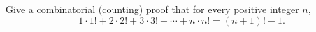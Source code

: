 Give a combinatorial (counting) proof that for every positive integer $n$,
\[
1\cdot1!+2\cdot2!+3\cdot3!+\cdots+n\cdot n!=(n+1)!-1 .
\]
